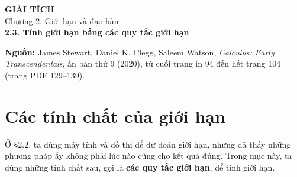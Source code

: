 \documentclass[12pt,a4paper]{article}
\begin{document}
\begin{center}
{\Large\bfseries GIẢI TÍCH}\\[5pt]
{\large Chương 2. Giới hạn và đạo hàm}\\[9pt]
{\Large\bfseries 2.3. Tính giới hạn bằng các quy tắc giới hạn}
\end{center}
\noindent\textbf{Nguồn:} James Stewart, Daniel K. Clegg, Saleem Watson, \textit{Calculus: Early Transcendentals}, ấn bản thứ 9 (2020), từ cuối trang in 94 đến hết trang 104 (trang PDF 129–139).
\section*{Các tính chất của giới hạn}
Ở §2.2, ta dùng máy tính và đồ thị để dự đoán giới hạn, nhưng đã thấy những phương pháp ấy không phải lúc nào cũng cho kết quả đúng. Trong mục này, ta dùng những tính chất sau, gọi là \textbf{các quy tắc giới hạn}, để tính giới hạn.
\end{document}
